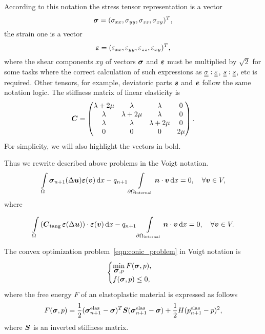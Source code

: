\documentclass[12pt]{article}
\begin{document}
According to this notation the stress tensor representation is a vector
\begin{equation}
    \mbox{\boldmath$\sigma$} = (\sigma_{xx}, \sigma_{yy}, \sigma_{zz}, \sigma_{xy})^T,  
\end{equation}
the strain one is a vector
\begin{equation}
    \mbox{\boldmath $\varepsilon$} = (\varepsilon_{xx}, \varepsilon_{yy}, \varepsilon_{zz}, \varepsilon_{xy})^T,
\end{equation}
where the shear components $xy$ of vectors $\mbox{\boldmath$\sigma$}$ and $\mbox{\boldmath $\varepsilon$}$ must be multiplied by $\sqrt{2}$ for some tasks where the correct calculation of such expressions as $\underline{\underline{\sigma}}:\underline{\underline{\varepsilon}}$, $\underline{\underline{s}}:\underline{\underline{s}}$, etc is required. Other tensors, for example, deviatoric parts $\mbox{\boldmath $s$}$ and $\mbox{\boldmath $e$}$ follow the same notation logic. The stiffness matrix of linear elasticity is 
\begin{equation}
    \mbox{\boldmath $C$} = 
    \begin{pmatrix}
        \lambda + 2\mu & \lambda & \lambda & 0 \\
        \lambda & \lambda + 2\mu & \lambda & 0 \\
        \lambda & \lambda & \lambda + 2\mu & 0 \\
        0 & 0 & 0 & 2\mu 
    \end{pmatrix}.
\end{equation}
For simplicity, we will also highlight the vectors in bold.

Thus we rewrite described above problems in the Voigt notation.
\begin{equation}
    \int\limits_\Omega\mbox{\boldmath$\sigma$}_{n+1}(\Delta\mbox{\boldmath $u$})\mbox{\boldmath $\varepsilon$}(\mbox{\boldmath $v$}) \, \mathrm{d} x - q_{n+1}\int\limits_{\partial\Omega_\text{internal}}\mbox{\boldmath $n$} \cdot \mbox{\boldmath $v$} \, \mathrm{d} x = 0, \quad \forall \mbox{\boldmath $v$} \in V,
\end{equation}
where 

\begin{equation}
    \int\limits_\Omega \left( \mbox{\boldmath $C$}_{\text{tang}} \, \mbox{\boldmath $\varepsilon$}(\Delta\mbox{\boldmath $u$}) \right) \cdot \mbox{\boldmath $\varepsilon$}(\mbox{\boldmath $v$}) \, \mathrm{d} x - q_{n+1}\int\limits_{\partial\Omega_\text{internal}}\mbox{\boldmath $n$} \cdot \mbox{\boldmath $v$} \, \mathrm{d} x = 0, \quad \forall \mbox{\boldmath $v$} \in V.
\end{equation}

The convex optimization problem~\ref{eqn:conic_problem} in Voigt notation is
\begin{equation}
    \label{eqn:conic_problem_Voigt}
    \begin{cases}
        \min\limits_{\mbox{\boldmath$\sigma$}, p} F(\mbox{\boldmath$\sigma$}, p), \\
        f(\mbox{\boldmath$\sigma$}, p) \leq 0,
    \end{cases}
\end{equation}
where the free energy $F$ of an elastoplastic material is expressed as follows
\begin{equation}
    F(\mbox{\boldmath$\sigma$}, p) = \frac{1}{2}(\mbox{\boldmath$\sigma$}_{n+1}^\text{elas} - \mbox{\boldmath$\sigma$})^T \mbox{\boldmath $S$} (\mbox{\boldmath$\sigma$}_{n+1}^\text{elas} - \mbox{\boldmath$\sigma$}) + \frac{1}{2}H(p_{n+1}^\text{elas} - p)^2,
\end{equation}
where $\mbox{\boldmath $S$}$ is an inverted stiffness matrix.
\end{document}
